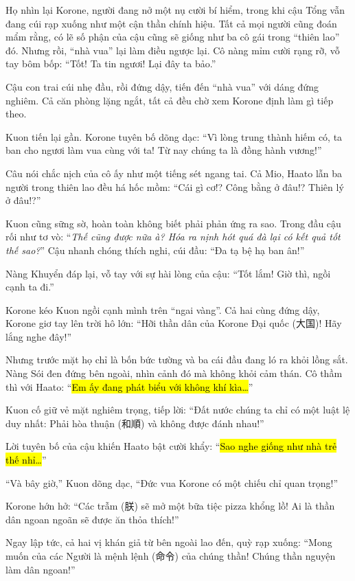 \documentclass[../main.tex]{subfiles}
\begin{document}
Họ nhìn lại Korone, người đang nở một nụ cười bí hiểm, trong khi cậu Tổng vẫn đang cúi rạp xuống như một cận thần chính hiệu. Tất cả mọi người cũng đoán mẩm rằng, có lẽ số phận của cậu cũng sẽ giống như ba cô gái trong ``thiên lao'' đó. Nhưng rồi, ``nhà vua'' lại làm điều ngược lại. Cô nàng mỉm cười rạng rỡ, vỗ tay bôm bốp: ``Tốt! Ta tin ngươi! Lại đây ta bảo.''

Cậu con trai cúi nhẹ đầu, rồi đứng dậy, tiến đến ``nhà vua'' với dáng đứng nghiêm. Cả căn phòng lặng ngắt, tất cả đều chờ xem Korone định làm gì tiếp theo.

Kuon tiến lại gần. Korone tuyên bố dõng dạc: ``Vì lòng trung thành hiếm có, ta ban cho ngươi làm vua cùng với ta! Từ nay chúng ta là đồng hành vương!''

Câu nói chắc nịch của cô ấy như một tiếng sét ngang tai. Cả Mio, Haato lẫn ba người trong thiên lao đều há hốc mồm: ``Cái gì cơ!? Công bằng ở đâu!? Thiên lý ở đâu!?''

Kuon cũng sững sờ, hoàn toàn không biết phải phản ứng ra sao. Trong đầu cậu rối như tơ vò: ``\textit{Thế cũng được nữa à? Hóa ra nịnh hót quá đà lại có kết quả tốt thế sao?}'' Cậu nhanh chóng thích nghi, cúi đầu: ``Đa tạ bệ hạ ban ân!''

Nàng Khuyển đáp lại, vỗ tay với sự hài lòng của cậu: ``Tốt lắm! Giờ thì, ngồi cạnh ta đi.''

Korone kéo Kuon ngồi cạnh mình trên ``ngai vàng''. Cả hai cùng đứng dậy, Korone giơ tay lên trời hô lớn: ``Hỡi thần dân của Korone Đại quốc (大国)! Hãy lắng nghe đây!''


Nhưng trước mặt họ chỉ là bốn bức tường và ba cái đầu đang ló ra khỏi lồng sắt. Nàng Sói đen đứng bên ngoài, nhìn cảnh đó mà không khỏi cảm thán. Cô thầm thì với Haato: ``\hl{Em ấy đang phát biểu với không khí kìa\dots}''

Kuon cố giữ vẻ mặt nghiêm trọng, tiếp lời: ``Đất nước chúng ta chỉ có một luật lệ duy nhất: Phải hòa thuận (和順) và không được đánh nhau!''


Lời tuyên bố của cậu khiến Haato bật cười khẩy: ``\hl{Sao nghe giống như nhà trẻ thế nhỉ\dots}''

``Và bây giờ,'' Kuon dõng dạc, ``Đức vua Korone có một chiếu chỉ quan trọng!''

Korone hớn hở: ``Các trẫm (朕) sẽ mở một bữa tiệc pizza khổng lồ! Ai là thần dân ngoan ngoãn sẽ được ăn thỏa thích!''

Ngay lập tức, cả hai vị khán giả từ bên ngoài lao đến, quỳ rạp xuống: ``Mong muốn của các Người là mệnh lệnh (命令) của chúng thần! Chúng thần nguyện làm dân ngoan!''
\end{document}
